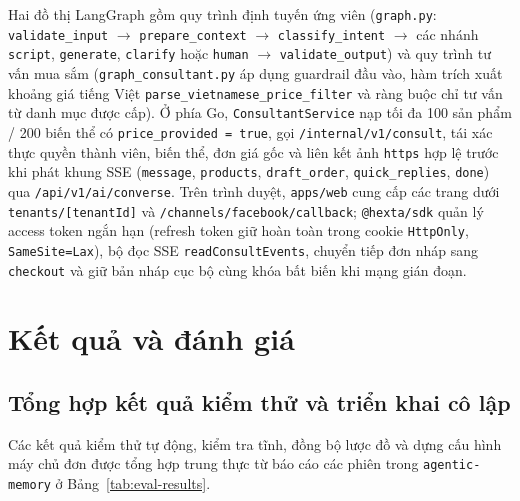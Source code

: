 Hai đồ thị LangGraph gồm quy trình định tuyến ứng viên (\texttt{graph.py}: \texttt{validate\_\hspace{0pt}input} $\rightarrow$ \texttt{prepare\_\hspace{0pt}context} $\rightarrow$
\texttt{classify\_\hspace{0pt}intent} $\rightarrow$ các nhánh \texttt{script}, \texttt{generate}, \texttt{clarify} hoặc \texttt{human} $\rightarrow$ \texttt{validate\_\hspace{0pt}output}) và quy trình tư vấn mua sắm
(\texttt{graph\_\hspace{0pt}consultant.py} áp dụng guardrail đầu vào, hàm trích xuất khoảng giá tiếng Việt \texttt{parse\_\hspace{0pt}vietnamese\_\hspace{0pt}price\_\hspace{0pt}filter} và ràng buộc chỉ tư vấn từ danh mục
được cấp).
Ở phía Go, \texttt{ConsultantService} nạp tối đa 100 sản phẩm / 200 biến thể có \texttt{price\_\hspace{0pt}provided = true}, gọi \texttt{/internal/\hspace{0pt}v1/\hspace{0pt}consult}, tái xác thực quyền thành
viên, biến thể, đơn giá gốc và liên kết ảnh \texttt{https} hợp lệ trước khi phát khung SSE (\texttt{message}, \texttt{products}, \texttt{draft\_\hspace{0pt}order},
\texttt{quick\_\hspace{0pt}replies}, \texttt{done}) qua \texttt{/api/\hspace{0pt}v1/\hspace{0pt}ai/\hspace{0pt}converse}.
Trên trình duyệt, \texttt{apps/web} cung cấp các trang dưới \texttt{tenants/\hspace{0pt}[tenantId]} và \texttt{/channels/\hspace{0pt}facebook/\hspace{0pt}callback}; \texttt{@hexta/sdk} quản lý access token ngắn
hạn (refresh token giữ hoàn toàn trong cookie \texttt{HttpOnly}, \texttt{SameSite=Lax}), bộ đọc SSE \texttt{readConsultEvents}, chuyển tiếp đơn nháp sang \texttt{checkout} và
giữ bản nháp cục bộ cùng khóa bất biến khi mạng gián đoạn.

\section{Kết quả và đánh giá}
\subsection{Tổng hợp kết quả kiểm thử và triển khai cô lập}
Các kết quả kiểm thử tự động, kiểm tra tĩnh, đồng bộ lược đồ và dựng cấu hình máy chủ đơn được tổng hợp trung thực từ báo cáo các phiên trong \texttt{agentic-memory} ở
Bảng~\ref{tab:eval-results}.

